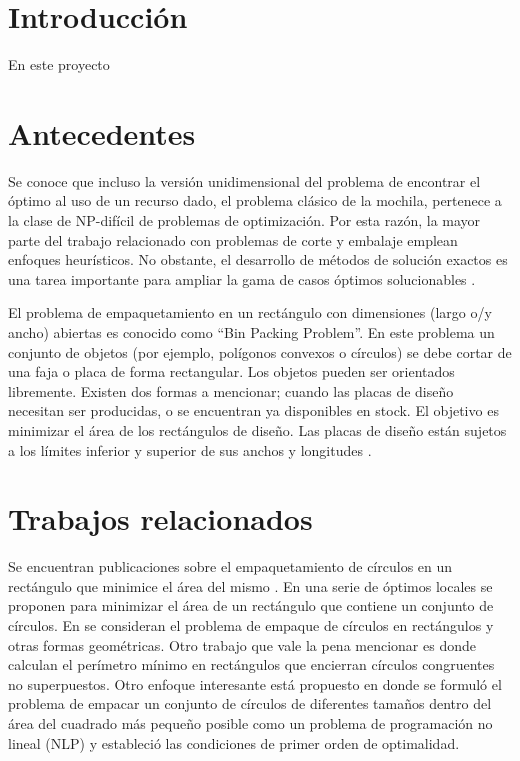 \documentclass{article}
\begin{document}
\begin{multicols}{2}
\section{Introducción} 
En este proyecto

\section{Antecedentes}
Se conoce que incluso la versión unidimensional del problema de encontrar el óptimo al uso de un recurso dado, el problema clásico de la mochila, pertenece a la clase de NP-difícil de problemas de optimización. Por esta razón, la mayor parte del trabajo relacionado con problemas de corte y embalaje emplean enfoques heurísticos. No obstante, el desarrollo de métodos de solución exactos es una tarea importante para ampliar la gama de casos óptimos solucionables \cite{leao}.

El problema de empaquetamiento en un rectángulo con dimensiones (largo o/y ancho) abiertas es conocido como “Bin Packing Problem”. En este problema un conjunto de objetos (por ejemplo, polígonos convexos o círculos) se debe cortar de una faja o placa de forma rectangular. Los objetos pueden ser orientados libremente. Existen dos formas a mencionar; cuando las placas de diseño necesitan ser producidas, o se encuentran ya disponibles en stock. El objetivo es minimizar el área de los rectángulos de diseño. Las placas de diseño están sujetos a los límites inferior y superior de sus anchos y longitudes \cite{roma}.


\section{Trabajos relacionados}

Se encuentran publicaciones sobre el empaquetamiento de círculos en un rectángulo que minimice el área del mismo \cite{luba}. En \cite{benn} una serie de óptimos locales se proponen para minimizar el área de un rectángulo que contiene un conjunto de círculos.
En \cite{kall} se consideran el problema de empaque de círculos en rectángulos y otras formas geométricas. Otro trabajo que vale la pena mencionar es \cite{hifi} donde calculan el perímetro mínimo en rectángulos que encierran círculos congruentes no superpuestos. Otro enfoque interesante está propuesto en \cite{arau} donde se formuló el problema de empacar un conjunto de círculos de diferentes tamaños dentro del área del cuadrado más pequeño posible como un problema de programación no lineal (NLP) y estableció las condiciones de primer orden de optimalidad.


\end{multicols}
\end{document}

